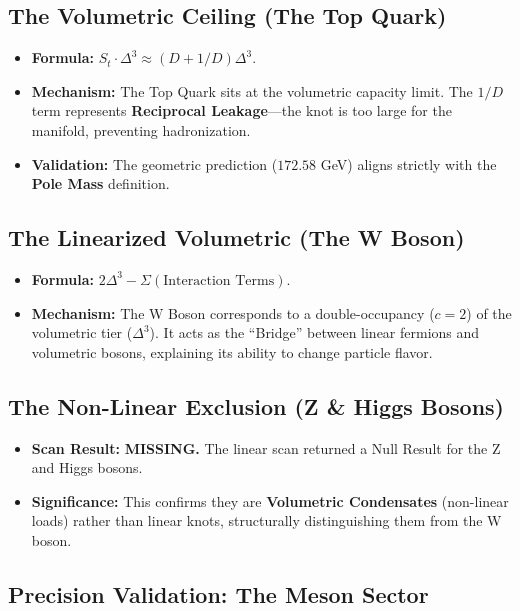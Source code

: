 \subsection*{The Volumetric Ceiling (The Top Quark)}
\begin{itemize}
    \item \textbf{Formula:} $S_t \cdot \Delta^3 \approx (D + 1/D)\Delta^3$.
    \item \textbf{Mechanism:} The Top Quark sits at the volumetric capacity limit. The $1/D$ term represents \textbf{Reciprocal Leakage}—the knot is too large for the manifold, preventing hadronization.
    \item \textbf{Validation:} The geometric prediction ($172.58$ GeV) aligns strictly with the \textbf{Pole Mass} definition.
\end{itemize}

\subsection*{The Linearized Volumetric (The W Boson)}
\begin{itemize}
    \item \textbf{Formula:} $2\Delta^3 - \Sigma (\text{Interaction Terms})$.
    \item \textbf{Mechanism:} The W Boson corresponds to a double-occupancy ($c=2$) of the volumetric tier ($\Delta^3$). It acts as the ``Bridge'' between linear fermions and volumetric bosons, explaining its ability to change particle flavor.
\end{itemize}

\subsection*{The Non-Linear Exclusion (Z \& Higgs Bosons)}
\begin{itemize}
    \item \textbf{Scan Result:} \textbf{MISSING.} The linear scan returned a Null Result for the Z and Higgs bosons.
    \item \textbf{Significance:} This confirms they are \textbf{Volumetric Condensates} (non-linear loads) rather than linear knots, structurally distinguishing them from the W boson.
\end{itemize}

\subsection*{Precision Validation: The Meson Sector}

